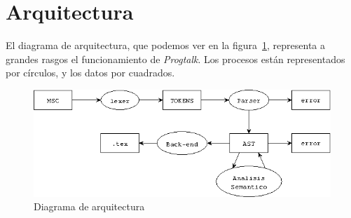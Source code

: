 
\section{Arquitectura}

El diagrama de arquitectura, que podemos ver en la
figura~\ref{fig:fig4}, representa a grandes rasgos el funcionamiento
de \textit{Progtalk}. Los procesos están representados por círculos, y
los datos por cuadrados.

\begin{figure}
  \includegraphics[scale=0.7]{./images/diag_arquitectura.png}
  \caption{Diagrama de arquitectura}
  \label{fig:fig4}
\end{figure}


